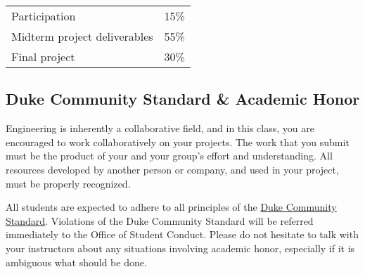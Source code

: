 \begin{center}
\begin{tabular}{ll}
Participation                           & 15\% \\
Midterm project deliverables            & 55\% \\
Final project                           & 30\% \\
\end{tabular}
\end{center}

\subsection*{Duke Community Standard \& Academic Honor} Engineering is
inherently a collaborative field, and in this class, you are encouraged to work
collaboratively on your projects.  The work that you submit must be the product
of your and your group's effort and understanding.  All resources developed by
another person or company, and used in your project, must be properly
recognized.
 
All students are expected to adhere to all principles of the
\href{http://www.integrity.duke.edu/standard.html}{Duke Community Standard}.
Violations of the Duke Community Standard will be referred immediately to the
Office of Student Conduct.  Please do not hesitate to talk with your instructors
about any situations involving academic honor, especially if it is ambiguous
what should be done.


